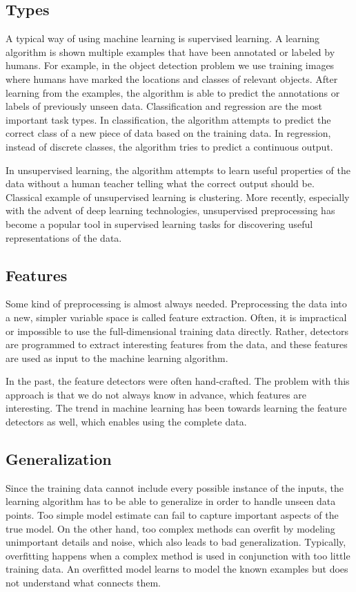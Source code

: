 \subsection{Types}
A typical way of using machine learning is supervised learning. A learning algorithm is shown multiple examples that have been annotated or labeled by humans. For example, in the object detection problem we use training images where humans have marked the locations and classes of relevant objects. After learning from the examples, the algorithm is able to predict the annotations or labels of previously unseen data. Classification and regression are the most important task types. In classification, the algorithm attempts to predict the correct class of a new piece of data based on the training data. In regression, instead of discrete classes, the algorithm tries to predict a continuous output.

In unsupervised learning, the algorithm attempts to learn useful properties of the data without a human teacher telling what the correct output should be. Classical example of unsupervised learning is clustering. More recently, especially with the advent of deep learning technologies, unsupervised preprocessing has become a popular tool in supervised learning tasks for discovering useful representations of the data.

\subsection{Features}
Some kind of preprocessing is almost always needed. Preprocessing the data into a new, simpler variable space is called feature extraction. Often, it is impractical or impossible to use the full-dimensional training data directly. Rather, detectors are programmed to extract interesting features from the data, and these features are used as input to the machine learning algorithm.

In the past, the feature detectors were often hand-crafted. The problem with this approach is that we do not always know in advance, which features are interesting. The trend in machine learning has been towards learning the feature detectors as well, which enables using the complete data.

\subsection{Generalization}
Since the training data cannot include every possible instance of the inputs, the learning algorithm has to be able to generalize in order to handle unseen data points. Too simple model estimate can fail to capture important aspects of the true model. On the other hand, too complex methods can overfit by modeling unimportant details and noise, which also leads to bad generalization. Typically, overfitting happens when a complex method is used in conjunction with too little training data. An overfitted model learns to model the known examples but does not understand what connects them.

